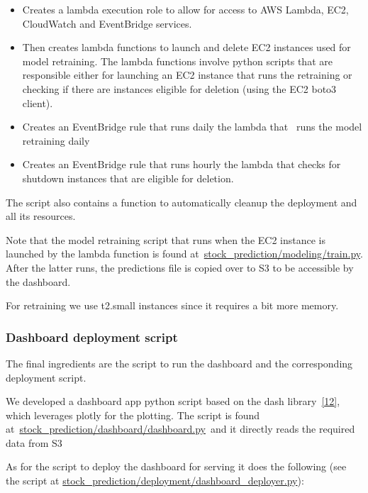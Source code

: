 \documentclass[10pt]{article}
\providecommand{\tightlist}{\setlength{\itemsep}{0pt}\setlength{\parskip}{0pt}}%
\begin{document}
\begin{itemize}
\tightlist
\item
  Creates a lambda execution role to allow for access to AWS Lambda,
  EC2, CloudWatch and EventBridge services.
\item
  Then creates lambda functions to launch and delete EC2 instances used
  for model retraining. The lambda functions involve python scripts that
  are responsible either for launching an EC2 instance that runs the
  retraining or checking if there are instances eligible for deletion
  (using the EC2 boto3 client).
\item
  Creates an EventBridge rule that runs daily the lambda that~ runs the
  model retraining daily
\item
  Creates an EventBridge rule that runs hourly the lambda that checks
  for shutdown instances that are eligible for deletion.~
\end{itemize}

The script also contains a function to automatically cleanup the
deployment and all its resources.

Note that the model retraining script that runs when the EC2 instance is
launched by the lambda function is found
at~\href{https://github.com/marcoopsampaio/aws_ml_eng_project_stock_prediction/blob/main/stock_prediction/modeling/train.py}{stock\_prediction/modeling/train.py}.
After the latter runs, the predictions file is copied over to S3 to be
accessible by the dashboard.

For retraining we use t2.small instances since it requires a bit more
memory.

\hypertarget{dashboard-deployment-script}{%
\subsubsection{Dashboard deployment
script}}

{\label{150161}}

The final ingredients are the script to run the dashboard and the
corresponding deployment script.~

We developed a dashboard app python script based on the dash
library~\hyperref[csl:12]{[12]}, which leverages plotly for the plotting. The
script is found
at~\href{https://github.com/marcoopsampaio/aws_ml_eng_project_stock_prediction/blob/main/stock_prediction/dashboard/dashboard.py}{stock\_prediction/dashboard/dashboard.py}~and
it directly reads the required data from S3

As for the script to deploy the dashboard for serving it does the
following (see the script at
\href{https://github.com/marcoopsampaio/aws_ml_eng_project_stock_prediction/blob/main/stock_prediction/deployment/dashboard_deployer.py}{stock\_prediction/deployment/dashboard\_deployer.py}):
\end{document}
